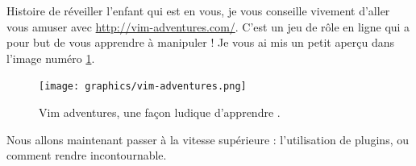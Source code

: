 \bigskip
Histoire de réveiller l'enfant qui est en vous, je vous conseille vivement d'aller vous amuser avec \url{http://vim-adventures.com/}. C'est un jeu de rôle en ligne qui a pour but de vous apprendre à manipuler \vim ! Je vous ai mis un petit aperçu dans l'image numéro \ref{fig:vim-adventures}.

\begin{figure}%
  \texttt{[image: graphics/vim-adventures.png]}
  \caption{Vim adventures, une façon ludique d'apprendre \vim.}
  \label{fig:vim-adventures}
\end{figure}


Nous allons maintenant passer à la vitesse supérieure : l'utilisation de plugins, ou comment rendre \vim incontournable.
